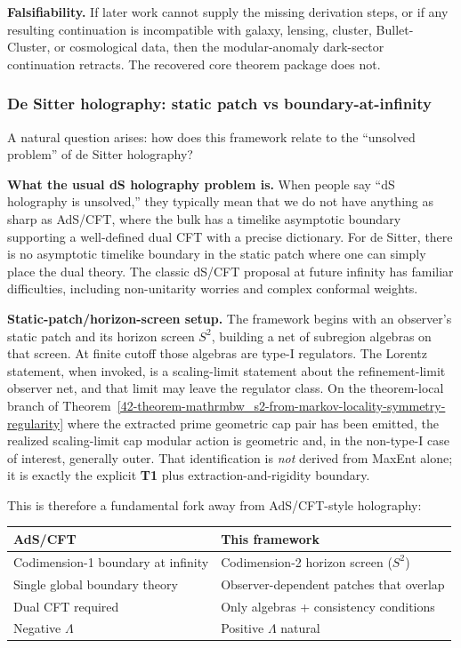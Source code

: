 \textbf{Falsifiability.} If later work cannot supply the missing derivation steps, or if any resulting continuation is incompatible with galaxy, lensing, cluster, Bullet-Cluster, or cosmological data, then the modular-anomaly dark-sector continuation retracts. The recovered core theorem package does not.

\subsubsection{De Sitter holography: static patch vs boundary-at-infinity}\label{516-de-sitter-holography-static-patch-vs-boundary-at-infinity}

A natural question arises: how does this framework relate to the ``unsolved problem'' of de Sitter holography?

\textbf{What the usual dS holography problem is.} When people say ``dS holography is unsolved,'' they typically mean that we do not have anything as sharp as AdS/CFT, where the bulk has a timelike asymptotic boundary supporting a well-defined dual CFT with a precise dictionary. For de Sitter, there is no asymptotic timelike boundary in the static patch where one can simply place the dual theory. The classic dS/CFT proposal at future infinity has familiar difficulties, including non-unitarity worries and complex conformal weights.

\textbf{Static-patch/horizon-screen setup.} The framework begins with an observer's static patch and its horizon screen \(S^2\), building a net of subregion algebras on that screen. At finite cutoff those algebras are type-I regulators. The Lorentz statement, when invoked, is a scaling-limit statement about the refinement-limit observer net, and that limit may leave the regulator class. On the theorem-local branch of Theorem~\ref{42-theorem-mathrmbw_s2-from-markov-locality-symmetry-regularity} where the extracted prime geometric cap pair has been emitted, the realized scaling-limit cap modular action is geometric and, in the non-type-I case of interest, generally outer. That identification is \emph{not} derived from MaxEnt alone; it is exactly the explicit \textbf{T1} plus extraction-and-rigidity boundary.

This is therefore a fundamental fork away from AdS/CFT-style holography:

{\def\LTcaptype{none}
\begin{longtable}[]{@{}>{\RaggedRight\arraybackslash}p{}>{\RaggedRight\arraybackslash}p{}@{}}
\toprule\noalign{}
AdS/CFT & This framework \\
\midrule\noalign{}
\endhead
\bottomrule\noalign{}
\endlastfoot
Codimension-1 boundary at infinity & Codimension-2 horizon screen (\(S^2\)) \\
Single global boundary theory & Observer-dependent patches that overlap \\
Dual CFT required & Only algebras + consistency conditions \\
Negative \(\Lambda\) & Positive \(\Lambda\) natural \\
\end{longtable}
}

